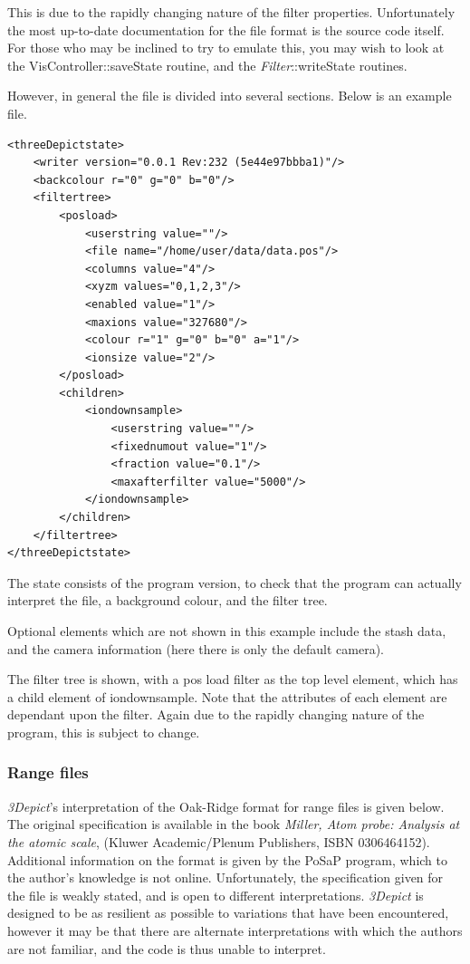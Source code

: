 \documentclass[10pt]{article}
\begin{document}
This is due to the rapidly changing nature of the filter properties. Unfortunately the most up-to-date documentation for the file format is the source code itself. For those who may be inclined to try to emulate this, you may wish to look at the VisController::saveState routine, and the \emph{Filter}::writeState routines.

However, in general the file is divided into several sections. Below is an example file.
\begin{verbatim}
<threeDepictstate>
    <writer version="0.0.1 Rev:232 (5e44e97bbba1)"/>
    <backcolour r="0" g="0" b="0"/>
    <filtertree>
        <posload>
            <userstring value=""/>
            <file name="/home/user/data/data.pos"/>
            <columns value="4"/>
            <xyzm values="0,1,2,3"/>
            <enabled value="1"/>
            <maxions value="327680"/>
            <colour r="1" g="0" b="0" a="1"/>
            <ionsize value="2"/>
        </posload>
        <children>
            <iondownsample>
                <userstring value=""/>
                <fixednumout value="1"/>
                <fraction value="0.1"/>
                <maxafterfilter value="5000"/>
            </iondownsample>
        </children>
    </filtertree>
</threeDepictstate>
\end{verbatim}

The state consists of the program version, to check that the program can actually interpret the file, a background colour, and the filter tree. 

Optional elements which are not shown in this example include the stash data, and the camera information (here there is only the default camera).

The filter tree is shown, with a pos load filter as the top level element, which has a child element of iondownsample. Note that the attributes of each element are dependant upon the filter. Again due to the rapidly changing nature of the program, this is subject to change.

\subsubsection{Range files}
\label{sec:rangeFormat}
\emph{3Depict}'s interpretation of the Oak-Ridge format for range files is given below. The original specification is available in the book \textit{Miller, Atom probe: Analysis at the atomic scale}, (Kluwer Academic/Plenum Publishers, ISBN 0306464152). Additional information on the format is given by the PoSaP program, which to the author's knowledge is not online. Unfortunately, the specification given for the file is weakly stated, and is open to different interpretations. \emph{3Depict} is designed to be as resilient as possible to variations that have been encountered, however it may be that there are alternate interpretations with which the authors are not familiar, and the code is thus unable to interpret.
\end{document}

